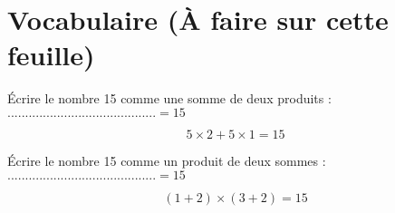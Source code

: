 \section{Vocabulaire  (\`A faire sur cette feuille)}

\begin{questions}
	\question \'Ecrire le nombre 15 comme une somme de deux produits : $ ..........................................= 15$
	\begin{solution}
		\begin{equation*}
			5 \times 2 + 5 \times 1 = 15
		\end{equation*}
	\end{solution}
	\vspace*{0.5cm}
	
	\question \'Ecrire le nombre 15 comme un produit de deux sommes : $..........................................=15$
	
	\begin{solution}
		\begin{equation*}
		(1 + 2) \times (3 + 2) = 15
		\end{equation*}
	\end{solution}
	
\end{questions}